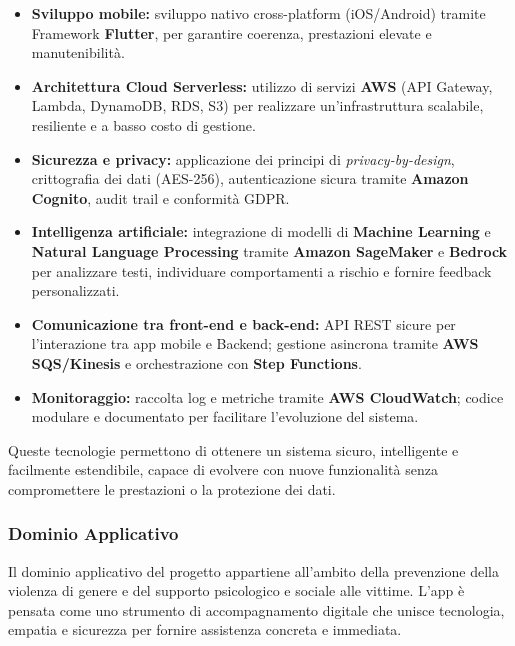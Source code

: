 \documentclass[a4paper,12pt]{article}
\begin{document}
\begin{itemize}
\item \textbf{Sviluppo mobile:} sviluppo nativo cross-platform (iOS/Android) tramite Framework \textbf{Flutter}, per garantire coerenza, prestazioni elevate e manutenibilità.
\item \textbf{Architettura Cloud Serverless:} utilizzo di servizi \textbf{AWS} (API Gateway, Lambda, DynamoDB, RDS, S3) per realizzare un’infrastruttura scalabile, resiliente e a basso costo di gestione.
\item \textbf{Sicurezza e privacy:} applicazione dei principi di \textit{privacy-by-design}, crittografia dei dati (AES-256), autenticazione sicura tramite \textbf{Amazon Cognito}, audit trail e conformità GDPR.
\item \textbf{Intelligenza artificiale:} integrazione di modelli di \textbf{Machine Learning} e \textbf{Natural Language Processing} tramite \textbf{Amazon SageMaker} e \textbf{Bedrock} per analizzare testi, individuare comportamenti a rischio e fornire feedback personalizzati.
\item \textbf{Comunicazione tra front-end e back-end:} API REST sicure per l’interazione tra app mobile e Backend; gestione asincrona tramite \textbf{AWS SQS/Kinesis} e orchestrazione con \textbf{Step Functions}.
\item \textbf{Monitoraggio:} raccolta log e metriche tramite \textbf{AWS CloudWatch}; codice modulare e documentato per facilitare l’evoluzione del sistema.
\end{itemize}

Queste tecnologie permettono di ottenere un sistema sicuro, intelligente e facilmente estendibile, capace di evolvere con nuove funzionalità senza compromettere le prestazioni o la protezione dei dati.

\subsubsection{Dominio Applicativo}
Il dominio applicativo del progetto appartiene all’ambito della prevenzione della violenza di genere e del supporto psicologico e sociale alle vittime. L’app è pensata come uno strumento di accompagnamento digitale che unisce tecnologia, empatia e sicurezza per fornire assistenza concreta e immediata.
\end{document}
